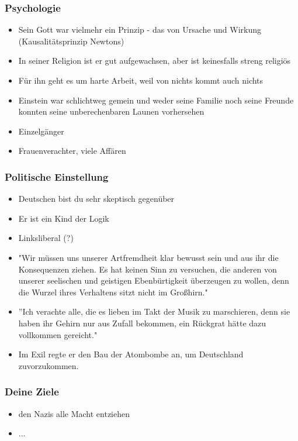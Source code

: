 \documentclass[12pt, a4paper, openany]{report}
\begin{document}
\subsubsection{Psychologie}
\begin{itemize}
\item Sein Gott war vielmehr ein Prinzip - das von Ursache und Wirkung (Kausalitätsprinzip Newtons)
\item In seiner Religion ist er gut aufgewachsen, aber ist keinesfalls streng religiös
\item Für ihn geht es um harte Arbeit, weil von nichts kommt auch nichts
\item Einstein war schlichtweg gemein und weder seine Familie noch seine Freunde konnten seine unberechenbaren Launen vorhersehen
\item Einzelgänger
\item Frauenverachter, viele Affären
\end{itemize}


\subsubsection{Politische Einstellung}
\begin{itemize}
\item Deutschen bist du sehr skeptisch gegenüber
\item Er ist ein Kind der Logik 
\item Linksliberal (?)
\item "Wir müssen uns unserer Artfremdheit klar bewusst sein und aus ihr die Konsequenzen ziehen. Es hat keinen Sinn zu versuchen, die anderen von unserer seelischen und geistigen Ebenbürtigkeit überzeugen zu wollen, denn die Wurzel ihres Verhaltens sitzt nicht im Großhirn."
\item ''Ich verachte alle, die es lieben im Takt der Musik zu marschieren, denn sie haben ihr Gehirn nur aus Zufall bekommen, ein Rückgrat hätte dazu vollkommen gereicht."
\item Im Exil regte er den Bau der Atombombe an, um Deutschland zuvorzukommen.
\end{itemize}

\subsubsection{Deine Ziele}
\begin{itemize}
\item den Nazis alle Macht entziehen
\item ...
\end{itemize}
\end{document}
